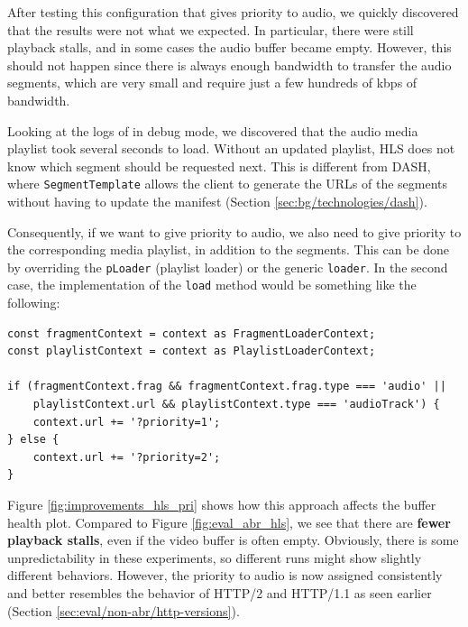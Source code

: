 After testing this configuration that gives priority to audio, we quickly discovered that the results were not what we expected. In particular, there were still playback stalls, and in some cases the audio buffer became empty. However, this should not happen since there is always enough bandwidth to transfer the audio segments, which are very small and require just a few hundreds of kbps of bandwidth.

Looking at the logs of \hlsjs{} in debug mode, we discovered that the audio media playlist took several seconds to load. Without an updated playlist, HLS does not know which segment should be requested next. This is different from DASH, where \texttt{SegmentTemplate} allows the client to generate the URLs of the segments without having to update the manifest (Section \ref{sec:bg/technologies/dash}).

Consequently, if we want to give priority to audio, we also need to give priority to the corresponding media playlist, in addition to the segments. This can be done by overriding the \texttt{pLoader} (playlist loader) or the generic \texttt{loader}. In the second case, the implementation of the \texttt{load} method would be something like the following:

\begin{verbatim}
const fragmentContext = context as FragmentLoaderContext;
const playlistContext = context as PlaylistLoaderContext;

if (fragmentContext.frag && fragmentContext.frag.type === 'audio' ||
    playlistContext.url && playlistContext.type === 'audioTrack') {
    context.url += '?priority=1';
} else {
    context.url += '?priority=2';
}
\end{verbatim}

Figure \ref{fig:improvements_hls_pri} shows how this approach affects the buffer health plot. Compared to Figure \ref{fig:eval_abr_hls}, we see that there are \textbf{fewer playback stalls}, even if the video buffer is often empty. Obviously, there is some unpredictability in these experiments, so different runs might show slightly different behaviors. However, the priority to audio is now assigned consistently and better resembles the behavior of HTTP/2 and HTTP/1.1 as seen earlier (Section \ref{sec:eval/non-abr/http-versions}).

